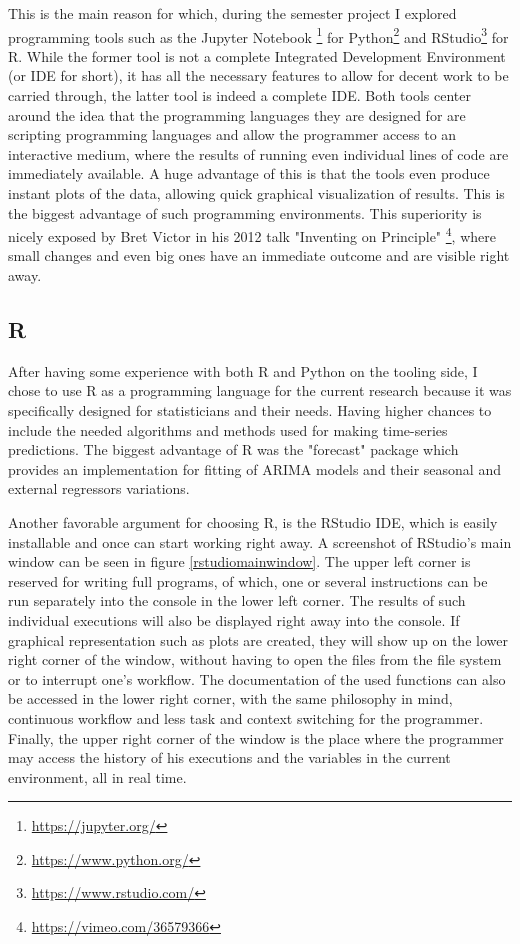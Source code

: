 \documentclass[12pt,a4paper,titlepage]{report}
\begin{document}
This is the main reason for which, during the semester project I explored programming tools such as the Jupyter Notebook \footnote{\url{https://jupyter.org/}} for Python\footnote{\url{https://www.python.org/}} and RStudio\footnote{\url{https://www.rstudio.com/}} for R. While the former tool is not a complete Integrated Development Environment (or IDE for short), it has all the necessary features to allow for decent work to be carried through, the latter tool is indeed a complete IDE. Both tools center around the idea that the programming languages they are designed for are scripting programming languages and allow the programmer access to an interactive medium, where the results of running even individual lines of code are immediately available. A huge advantage of this is that the tools even produce instant plots of the data, allowing quick graphical visualization of results. This is the biggest advantage of such programming environments. This superiority is nicely exposed by Bret Victor in his 2012 talk "Inventing on Principle" \footnote{\url{https://vimeo.com/36579366}}, where small changes and even big ones have an immediate outcome and are visible right away.

\subsection{R} \label{rtheorysection}

After having some experience with both R and Python on the tooling side, I chose to use R as a programming language for the current research because it was specifically designed for statisticians and their needs. Having higher chances to include the needed algorithms and methods used for making time-series predictions. The biggest advantage of R was the "forecast" package \cite{rforecastpackage} \cite{automatictimeseriesforecasting} which provides an implementation for fitting of ARIMA models and their seasonal and external regressors variations.

Another favorable argument for choosing R, is the RStudio IDE, which is easily installable and once can start working right away.
A screenshot of RStudio's main window can be seen in figure \ref{rstudiomainwindow}. The upper left corner is reserved for writing full programs, of which, one or several instructions can be run separately into the console in the lower left corner. The results of such individual executions will also be displayed right away into the console. If graphical representation such as plots are created, they will show up on the lower right corner of the window, without having to open the files from the file system or to interrupt one's workflow. The documentation of the used functions can also be accessed in the lower right corner, with the same philosophy in mind, continuous workflow and less task and context switching for the programmer. Finally, the upper right corner of the window is the place where the programmer may access the history of his executions and the variables in the current environment, all in real time.
\end{document}
